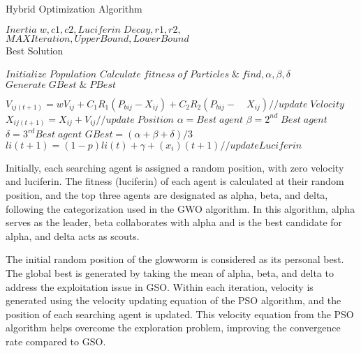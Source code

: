 \documentclass[conference]{IEEEtran}
\begin{document}
\begin{abstract1}
 
 
 
 
 \begin{algorithm}
	\caption{Hybrid Optimization Algorithm}
	\label{Algo:HOA}
	\begin{algorithmic}[1]
		\renewcommand{\algorithmicrequire}{\textbf{Input:}}
		\renewcommand{\algorithmicensure}{\textbf{Output:}}
		\REQUIRE $Inertia\; w, c1, c2, Luciferin\; Decay, r1, r2,$\\
		$MAX Iteration, Upper Bound, Lower Bound$\\
	
		
		\ENSURE  Best Solution
		
		\STATE $Initialize\; Population$
		\STATE $Calculate\;fitness\;of\;Particles\; \& \;find , \alpha, \beta, \delta$
		\STATE $Generate\; GBest\; \& \;PBest$
			
			
			\STATE  $ V_{ij(t+1)}=wV_{ij}+C_{1}R_{1}(P_{bij}-X_{ij})+C_{2}R_{2}(P_{bij}-\quad X_{ij})//update\; Velocity$
			\STATE$ X_{ij(t+1)}= X_{ij} + V_{ij}//update\; Position$
			\STATE $\alpha = Best\; agent$
			\STATE $\beta = 2^{nd}\; Best\; agent$
			\STATE $\delta = 3^{rd} Best\; agent$
			\STATE $GBest = (\alpha + \beta+\delta)/3$
			\STATE $li(t+1)= (1-p)li(t)+\gamma +(x_{i})(t+1)//update Luciferin$
			\ENDFOR
			
	
		
		\ENDWHILE
		
	
		
	\end{algorithmic} 
\end{algorithm}


	Initially, each searching agent is assigned a random position, with zero velocity and luciferin. The fitness (luciferin) of each agent is calculated at their random position, and the top three agents are designated as alpha, beta, and delta, following the categorization used in the GWO algorithm. In this algorithm, alpha serves as the leader, beta collaborates with alpha and is the best candidate for alpha, and delta acts as scouts.

The initial random position of the glowworm is considered as its personal best. The global best is generated by taking the mean of alpha, beta, and delta to address the exploitation issue in GSO. Within each iteration, velocity is generated using the velocity updating equation of the PSO algorithm, and the position of each searching agent is updated. This velocity equation from the PSO algorithm helps overcome the exploration problem, improving the convergence rate compared to GSO.


\end{abstract1}
\end{document}
